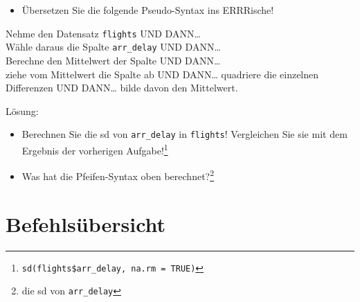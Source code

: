 \documentclass[12pt,ngerman,]{book}
\makeatletter
\newenvironment{Shaded}{\begin{snugshade}}{\end{snugshade}}
\newcommand{\KeywordTok}[1]{\textcolor[rgb]{0.13,0.29,0.53}{\textbf{{#1}}}}
\newcommand{\DataTypeTok}[1]{\textcolor[rgb]{0.13,0.29,0.53}{{#1}}}
\newcommand{\DecValTok}[1]{\textcolor[rgb]{0.00,0.00,0.81}{{#1}}}
\newcommand{\StringTok}[1]{\textcolor[rgb]{0.31,0.60,0.02}{{#1}}}
\newcommand{\CommentTok}[1]{\textcolor[rgb]{0.56,0.35,0.01}{\textit{{#1}}}}
\newcommand{\OtherTok}[1]{\textcolor[rgb]{0.56,0.35,0.01}{{#1}}}
\newcommand{\NormalTok}[1]{{#1}}
\providecommand{\tightlist}{%
  \setlength{\itemsep}{0pt}\setlength{\parskip}{0pt}}
\let\rmarkdownfootnote\footnote%
\def\footnote{\protect\rmarkdownfootnote}
\newenvironment{kframe}{%
\medskip{}
\setlength{\fboxsep}{.8em}
 \def\at@end@of@kframe{}%
 \ifinner\ifhmode%
  \def\at@end@of@kframe{\end{minipage}}%
  \begin{minipage}{\columnwidth}%
 \fi\fi%
 \def\FrameCommand##1{\hskip\@totalleftmargin \hskip-\fboxsep
 \colorbox{shadecolor}{##1}\hskip-\fboxsep
     \hskip-\linewidth \hskip-\@totalleftmargin \hskip\columnwidth}%
 \MakeFramed {\advance\hsize-\width
   \@totalleftmargin\z@ \linewidth\hsize
   \@setminipage}}%
 {\par\unskip\endMakeFramed%
 \at@end@of@kframe}
\renewenvironment{Shaded}{\begin{kframe}}{\end{kframe}}
\let\BeginKnitrBlock\begin \let\EndKnitrBlock\end
\makeatother
\begin{document}
\begin{itemize}
\tightlist
\item
  Übersetzen Sie die folgende Pseudo-Syntax ins ERRRische!
\end{itemize}

\BeginKnitrBlock{rmdpseudocode}
Nehme den Datensatz \texttt{flights} UND DANN\ldots{}\\
Wähle daraus die Spalte \texttt{arr\_delay} UND DANN\ldots{}\\
Berechne den Mittelwert der Spalte UND DANN\ldots{}\\
ziehe vom Mittelwert die Spalte ab UND DANN\ldots{} quadriere die
einzelnen Differenzen UND DANN\ldots{} bilde davon den Mittelwert.
\EndKnitrBlock{rmdpseudocode}

Lösung:

\begin{Shaded}
\end{Shaded}

\begin{itemize}
\item
  Berechnen Sie die sd von \texttt{arr\_delay} in \texttt{flights}!
  Vergleichen Sie sie mit dem Ergebnis der vorherigen Aufgabe!\footnote{\texttt{sd(flights\$arr\_delay,\ na.rm\ =\ TRUE)}}
\item
  Was hat die Pfeifen-Syntax oben berechnet?\footnote{die sd von
    \texttt{arr\_delay}}
\end{itemize}

\section{Befehlsübersicht}\label{befehlsubersicht-2}
\end{document}
